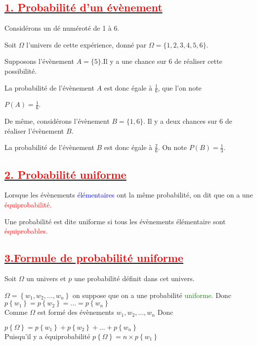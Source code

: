 \documentclass[12pt,a4paper]{article}
\begin{document}
\subsection*{\underline{\textbf{\textcolor{red}{1. Probabilité d'un évènement}}}}

Considérons un dé numéroté de 1 à 6.

Soit $\Omega$ l'univers de cette expérience, donné par $\Omega=\{1, 2, 3, 4, 5, 6\}$.

Supposons l'évènement $A=\{5\}$.Il y a une chance sur 6 de réaliser cette possibilité.

La probabilité de l'évènement $A$ est donc égale à $\frac{1}{6}$, que l'on note

 $P(A)=\frac{1}{6}$.

De même, considérons l'évènement $B=\{1, 6\}$. Il y a deux chances sur 6 de réaliser l'évènement $B$.

La probabilité de l'évènement $B$ est donc égale à $\frac{2}{6}$. On note $P(B)=\frac{1}{3}$.
\subsection*{\underline{\textbf{\textcolor{red}{2. Probabilité uniforme}}}}
Lorsque les évènements \textcolor{blue}{élémentaires} ont la même probabilité, on dit que on a une 
\textcolor{red}{équiprobabilité.}

Une probabilité est dite uniforme si tous les évènements élémentaire sont \textcolor{red}{équiprobables}.\\
\subsection*{\underline{\textbf{\textcolor{red}{3.Formule de probabilité uniforme}}}}
Soit $\Omega$ un univers et $p$ une probabilité définit dans cet univers.

$\Omega=\left\lbrace w_{1}, w_{2},...,w_{n}\right\rbrace $ on suppose que on a une probabilité \textcolor{green}{uniforme.}
Donc $p\left\lbrace w_{1} \right\rbrace =p\left\lbrace w_{2} \right\rbrace =...
=p\left\lbrace w_{n} \right\rbrace$\\
Comme $\Omega$ est formé des évènements $w_{1}, w_{2},...,w_{n}$ Donc


$p\left\lbrace \Omega\right\rbrace =p\left\lbrace w_{1} \right\rbrace +p\left\lbrace w_{2} \right\rbrace +...+p\left\lbrace w_{n} \right\rbrace$\\
Puisqu'il y a équiprobabilité 
$p\left\lbrace \Omega\right\rbrace =n\times p\left\lbrace w_{1} \right\rbrace$
\end{document}
